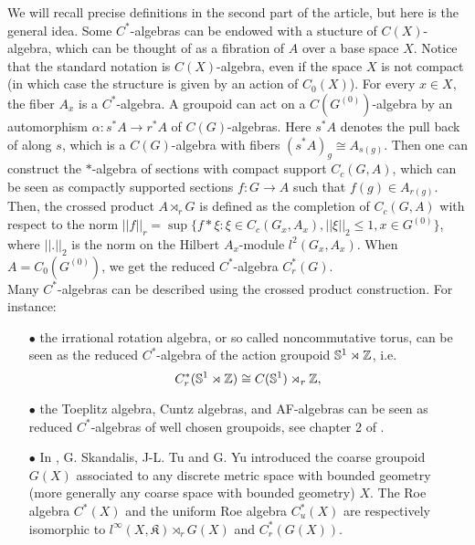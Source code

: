 We will recall precise definitions in the second part of the article, but here is the general idea. Some $C^*$-algebras can be endowed with a stucture of $C(X)$-algebra, which can be thought of as a fibration of $A$ over a base space $X$. Notice that the standard notation is $C(X)$-algebra, even if the space $X$ is not compact (in which case the structure is given by an action of $C_0(X)$). For every $x\in X$, the fiber $A_x$ is a $C^*$-algebra. A groupoid can act on a $C(G^{(0)})$-algebra by an automorphism $\alpha : s^* A \rightarrow r^* A $ of $C(G)$-algebras. Here $s^* A$ denotes the pull back of along $s$, which is a $C(G)$-algebra with fibers $(s^* A)_g \cong A_{s(g)}$. Then one can construct the $*$-algebra of sections with compact support $C_c(G,A)$, which can be seen as compactly supported sections $f : G \rightarrow A$ such that $f(g)\in A_{r(g)}$. Then, the crossed product $A\rtimes_r G$ is defined as the completion of $C_c(G,A)$ with respect to the norm $||f||_r =\sup \{f \ast \xi : \xi \in C_c(G_x,A_x),||\xi||_2\leq 1,x\in G^{(0)}\}$, where $||.||_2$ is the norm on the Hilbert $A_x$-module $l^2(G_x,A_x)$. When $A= C_0(G^{(0)})$, we get the reduced $C^*$-algebra $C^*_r(G)$.\\
 
Many $C^*$-algebras can be described using the crossed product construction. For instance:
\begin{itemize}
\item[$\bullet$] the irrational rotation algebra, or so called noncommutative torus, can be seen as the reduced $C^*$-algebra of the action groupoid $\mathbb S^1 \rtimes \mathbb Z$, i.e.
\[C^*_r(\mathbb S^1 \rtimes \mathbb Z)\cong C(\mathbb S^1)\rtimes_r \mathbb Z ,\]
\item[$\bullet$] the Toeplitz algebra, Cuntz algebras, and AF-algebras can be seen as reduced $C^*$-algebras of well chosen groupoids, see chapter 2 of \cite{RenaultDynamical}.
\item[$\bullet$] In \cite{SkTuYu}, G. Skandalis, J-L. Tu and G. Yu introduced the coarse groupoid $G(X)$ associated to any discrete metric space with bounded geometry (more generally any coarse space with bounded geometry) $X$. The Roe algebra $C^*(X)$ and the uniform Roe algebra $C_u^*(X)$ are respectively isomorphic to $l^\infty (X,\mathfrak K)\rtimes_r G(X)$ and $C_r^*(G(X))$. 
\end{itemize}

